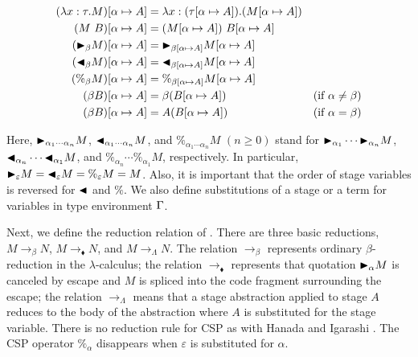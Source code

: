 \begin{align*}
    (\lambda x:\tau.M)[\alpha \mapsto A] & = \lambda x:(\tau[\alpha \mapsto A]).(M[\alpha \mapsto A])                                  \\
    (M\ B)[\alpha \mapsto A]             & = (M[\alpha \mapsto A])\ B[\alpha\mapsto A]                                                 \\
    ({\mathop{\blacktriangleright}}_\beta M)[\alpha \mapsto A]      & = {\mathop{\blacktriangleright}}_{\beta[\alpha \mapsto A]}M[\alpha \mapsto A]                                          \\
    ({\mathop{\blacktriangleleft}}_\beta M)[\alpha \mapsto A]     & = {\mathop{\blacktriangleleft}}_{\beta[\alpha \mapsto A]}M[\alpha \mapsto A]                                         \\
    (\%_\beta M)[\alpha \mapsto A]       & = \%_{\beta[\alpha \mapsto A]}M[\alpha \mapsto A]                                           \\
    (\beta B)[\alpha \mapsto A]          & = \beta (B[\alpha\mapsto A])                               & (\text{if } \alpha \neq \beta) \\
    (\beta B)[\alpha \mapsto A]          & = A (B[\alpha\mapsto A])                                   & (\text{if } \alpha = \beta)
\end{align*}


Here, ${\mathop{\blacktriangleright}}_{\alpha_1\cdots\alpha_n} M$, ${\mathop{\blacktriangleleft}}_{\alpha_1\cdots\alpha_n} M$, and
$\%_{\alpha_1\cdots\alpha_n} M$ $(n \geq 0)$ stand for ${\mathop{\blacktriangleright}}_{\alpha_1} \cdots
{\mathop{\blacktriangleright}}_{\alpha_n} M$, ${\mathop{\blacktriangleleft}}_{\alpha_n}\cdots {\mathop{\blacktriangleleft}}_{\alpha_1} M$, and
$\%_{\alpha_n}\cdots \%_{\alpha_1} M$, respectively.  In particular,
${\mathop{\blacktriangleright}}_{\varepsilon} M = {\mathop{\blacktriangleleft}}_{\varepsilon} M = \%_{\varepsilon} M = M$.  Also,
it is important that the order of stage variables is reversed for ${\mathop{\blacktriangleleft}}$ and
$\%$.  We also define substitutions of a stage or a term for variables in type
environment $\Gamma$.


Next, we define the reduction relation of \LMD. There are three basic
reductions, $M \longrightarrow_\beta N$, $M \longrightarrow_\blacklozenge N$,
and $M \longrightarrow_\Lambda N$.  The relation $\longrightarrow_\beta$
represents ordinary $\beta$-reduction in the \(\lambda\)-calculus; the relation
$\longrightarrow_\blacklozenge$ represents that quotation ${\mathop{\blacktriangleright}}_\alpha M$ is
canceled by escape and $M$ is spliced into the code fragment surrounding the
escape; the relation $\longrightarrow_\Lambda$ means that a stage abstraction
applied to  stage $A$ reduces to the body of the abstraction where $A$ is
substituted for the stage variable.  There is no reduction rule for CSP as with
Hanada and Igarashi \cite{Hanada2014}.  The CSP operator $\%_\alpha$ disappears
when $\varepsilon$ is substituted for $\alpha$.

